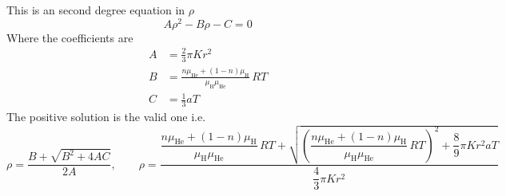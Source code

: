 This is an second degree equation in $\rho$
\[
  A\rho^2 - B\rho - C = 0
\]
Where the coefficients are
\begin{align*}
  A &= \frac{2}{3}\pi K r^2 \\
  B &= \frac{n\mu_{\mathrm{He}} + (1-n)\mu_{\mathrm{H}}}{\mu_{\mathrm{H}}\mu_{\mathrm{He}}}\,RT \\
  C &= \frac{1}{3}aT
\end{align*}
The positive solution is the valid one i.e.
\[
  \rho = \frac{B + \sqrt{B^2 + 4AC}}{2A}, \qquad
  \rho = \frac{\dfrac{n\mu_{\mathrm{He}} + (1-n)\mu_{\mathrm{H}}}{\mu_{\mathrm{H}}\mu_{\mathrm{He}}}\,RT
    + \sqrt{\left(\dfrac{n\mu_{\mathrm{He}} + (1-n)\mu_{\mathrm{H}}}{\mu_{\mathrm{H}}\mu_{\mathrm{He}}}\,RT\right)^{\!2}
    + \dfrac{8}{9}\pi K r^2 aT}}
    {\dfrac{4}{3}\pi K r^2}
\]
